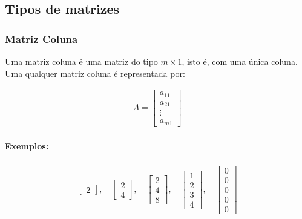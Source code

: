 \subsection{Tipos de matrizes}
\indent

\subsubsection{Matriz Coluna}
\indent

Uma matriz coluna é uma matriz do tipo \( m \times 1 \), isto é, com uma única coluna. Uma qualquer matriz coluna é representada por:

\[
    \begin{matrix}
        A = \begin{bmatrix}
                a_{11} \\
                a_{21} \\
                \vdots \\
                a_{m1}
            \end{bmatrix}
    \end{matrix}
\]

\paragraph{Exemplos:}

\[
    \begin{matrix}
        \begin{bmatrix}
            2
        \end{bmatrix},
        \quad
        \begin{bmatrix}
            2 \\
            4
        \end{bmatrix},
        \quad
        \begin{bmatrix}
            2 \\
            4 \\
            8
        \end{bmatrix},
        \quad
        \begin{bmatrix}
            1 \\
            2 \\
            3 \\
            4
        \end{bmatrix},
        \quad
        \begin{bmatrix}
            0 \\
            0 \\
            0 \\
            0 \\
            0
        \end{bmatrix}
    \end{matrix}
\]

